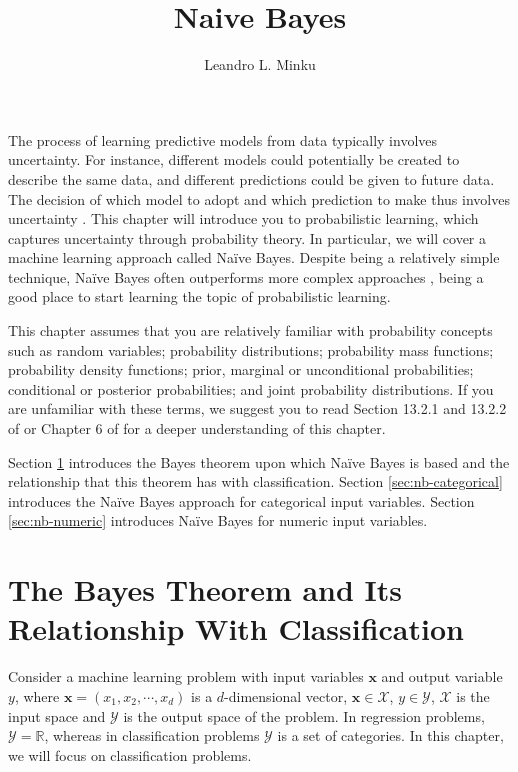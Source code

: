 \title{Naive Bayes}
\label{chp:naive-bayes}
\author{Leandro L. Minku}
\maketitle


The process of learning predictive models from data typically involves uncertainty. For instance, different models could potentially be created to describe the same data, and different predictions could be given to future data. The decision of which model to adopt and which prediction to make thus involves uncertainty \cite{ProbabilisticLearningNature}. This chapter will introduce you to probabilistic learning, which captures uncertainty through probability theory. In particular, we will cover a machine learning approach called Na\"ive Bayes. Despite being a relatively simple technique, Na\"ive Bayes often outperforms more complex approaches \cite{ElementsStatisticalLearning}, being a good place to start learning the topic of probabilistic learning.

This chapter assumes that you are relatively familiar with probability concepts such as random variables; probability distributions; probability mass functions; probability density functions; prior, marginal or unconditional probabilities; conditional or posterior probabilities; and joint probability distributions. If you are unfamiliar with these terms, we suggest you to read Section 13.2.1 and 13.2.2 of \cite{RussellNorvig} or Chapter 6 of \cite{MathsForML} for a deeper understanding of this chapter.

Section \ref{sec:bayes-theorem}  introduces the Bayes theorem upon which Na\"ive Bayes is based and the relationship that this theorem has with classification. Section \ref{sec:nb-categorical} introduces the Na\"ive Bayes approach for categorical input variables. Section \ref{sec:nb-numeric} introduces Na\"ive Bayes for numeric input variables.


\section{The Bayes Theorem and Its Relationship With Classification}
\label{sec:bayes-theorem}

Consider a machine learning problem with input variables $\mathbf{x}$ and output variable $y$, where $\mathbf{x} = (x_1,x_2,\cdots,x_d)$ is a $d$-dimensional vector, $\mathbf{x} \in \mathcal{X}$, $y \in \mathcal{Y}$, $\mathcal{X}$ is the input space and $\mathcal{Y}$ is the output space of the problem. In regression problems, $\mathcal{Y} = \mathbb{R}$, whereas in classification problems $\mathcal{Y}$ is a set of categories. In this chapter, we will focus on classification problems. 

